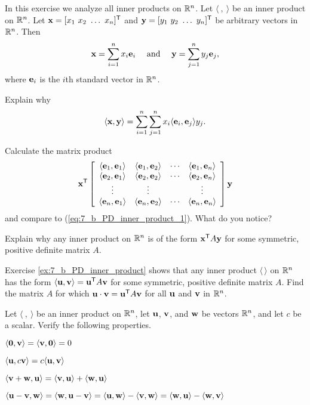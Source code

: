 \item \label{ex:7_b_PD_inner_product} In this exercise we analyze all inner products on $\mathbb{R}^n$.  Let $\langle \ , \ \rangle$ be an inner product on $\mathbb{R}^n$. Let $\vx = [x_1 \ x_2 \ \ldots \ x_n]^{\tr}$ and $\vy = [y_1 \ y_2 \ \ldots \ y_n]^{\tr}$ be arbitrary vectors in $\mathbb{R}^n$. Then
\[\mathbf{x} = \sum_{i=1}^n x_i \mathbf{e}_i \ \ \ \text{ and } \ \ \ \mathbf{y} = \sum_{j=1}^n y_j \mathbf{e}_j,\]
where $\mathbf{e}_i$ is the $i$th standard vector in $\mathbb{R}^n$.
    \ba
    \item Explain why
    \begin{equation} \label{eq:7_b_PD_inner_product_1}
    \langle \mathbf{x}, \mathbf{y} \rangle = \sum_{i=1}^n \sum_{j=1}^n x_i \langle \mathbf{e}_i, \mathbf{e}_j \rangle y_j.
    \end{equation}


    \item Calculate the matrix product
\[\mathbf{x}^{\mathsf{T}} \left[ \begin{array}{cccc}
\langle \mathbf{e}_1,\mathbf{e}_1 \rangle & \langle \mathbf{e}_1,\mathbf{e}_2 \rangle & \cdots & \langle \mathbf{e}_1,\mathbf{e}_n \rangle \\
\langle \mathbf{e}_2,\mathbf{e}_1 \rangle & \langle \mathbf{e}_2,\mathbf{e}_2 \rangle & \cdots & \langle \mathbf{e}_2,\mathbf{e}_n \rangle \\
\vdots                      &  \vdots                       &       & \vdots \\
\langle \mathbf{e}_n,\mathbf{e}_1 \rangle & \langle \mathbf{e}_n,\mathbf{e}_2 \rangle & \cdots & \langle \mathbf{e}_n,\mathbf{e}_n \rangle
\end{array} \right] \mathbf{y}\]
and compare to (\ref{eq:7_b_PD_inner_product_1}). What do you notice?

    \item Explain why any inner product on $\mathbb{R}^n$ is of the form $\mathbf{x}^{\mathsf{T}} A \mathbf{y}$ for some symmetric, positive definite matrix $A$.

   
    \ea

\item \label{ex:7_b_dot_product}  Exercise \ref{ex:7_b_PD_inner_product} shows that any inner product $\langle \, \rangle$ on $\mathbb{R}^n$ has the form $\langle \mathbf{u}, \mathbf{v} \rangle = \mathbf{u}^{\mathsf{T}} A  \mathbf{v}$ for some symmetric, positive definite matrix $A$. Find the matrix $A$ for which $\mathbf{u} \cdot \mathbf{v} = \mathbf{u}^{\mathsf{T}} A  \mathbf{v}$ for all $\mathbf{u}$ and $\mathbf{v}$ in $\mathbb{R}^n$. 


\item Let $\langle \ , \ \rangle$ be an inner product on $\mathbb{R}^n$, let $\mathbf{u}$, $\mathbf{v}$, and $\mathbf{w}$ be vectors $\mathbb{R}^n$, and let $c$ be a scalar. Verify the following properties.
\ba
	\item $\langle \mathbf{0} , \mathbf{v} \rangle = \langle \mathbf{v} , \mathbf{0} \rangle = 0$
	\item $\langle \mathbf{u} , c\mathbf{v} \rangle = c\langle \mathbf{u} , \mathbf{v} \rangle$
	\item $\langle \mathbf{v}+\mathbf{w} , \mathbf{u} \rangle = \langle \mathbf{v} , \mathbf{u} \rangle + \langle \mathbf{w} , \mathbf{u} \rangle$
	\item $\langle \mathbf{u} - \mathbf{v}, \mathbf{w} \rangle = \langle \mathbf{w}, \mathbf{u} - \mathbf{v} \rangle= \langle \mathbf{u} , \mathbf{w} \rangle - \langle \mathbf{v} , \mathbf{w} \rangle= \langle \mathbf{w}, \mathbf{u} \rangle - \langle \mathbf{w}, \mathbf{v} \rangle$
\ea

